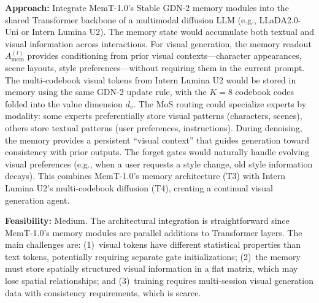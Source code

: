 \documentclass[11pt,a4paper]{article}
\begin{document}
\textbf{Approach:} Integrate MemT-1.0's Stable GDN-2 memory modules into the shared Transformer backbone of a multimodal diffusion LLM (e.g., LLaDA2.0-Uni or Intern Lumina U2). The memory state would accumulate both textual and visual information across interactions. For visual generation, the memory readout $A^{(l)}_{\text{mem}}$ provides conditioning from prior visual contexts---character appearances, scene layouts, style preferences---without requiring them in the current prompt. The multi-codebook visual tokens from Intern Lumina U2 would be stored in memory using the same GDN-2 update rule, with the $K{=}8$ codebook codes folded into the value dimension $d_v$. The MoS routing could specialize experts by modality: some experts preferentially store visual patterns (characters, scenes), others store textual patterns (user preferences, instructions). During denoising, the memory provides a persistent ``visual context'' that guides generation toward consistency with prior outputs. The forget gates would naturally handle evolving visual preferences (e.g., when a user requests a style change, old style information decays). This combines MemT-1.0's memory architecture (T3) with Intern Lumina U2's multi-codebook diffusion (T4), creating a continual visual generation agent.

\textbf{Feasibility:} Medium. The architectural integration is straightforward since MemT-1.0's memory modules are parallel additions to Transformer layers. The main challenges are: (1)~visual tokens have different statistical properties than text tokens, potentially requiring separate gate initializations; (2)~the memory must store spatially structured visual information in a flat matrix, which may lose spatial relationships; and (3)~training requires multi-session visual generation data with consistency requirements, which is scarce.
\end{document}
